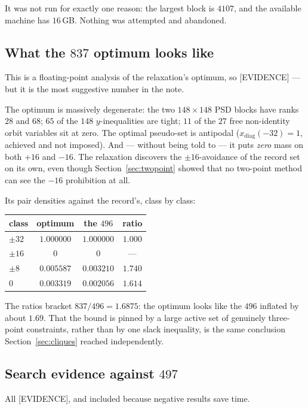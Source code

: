 \documentclass[10pt,a4paper]{article}
\newcommand{\EV}{\textsf{[EVIDENCE]}}
\begin{document}
It was not run for exactly one reason: the largest block is $4107$, and the available machine has
$16$\,GB. Nothing was attempted and abandoned.

\subsection{What the $837$ optimum looks like}\label{sec:slack}

This is a floating-point analysis of the relaxation's optimum, so \EV{} --- but it is the most
suggestive number in the note.

The optimum is massively degenerate: the two $148 \times 148$ PSD blocks have ranks $28$ and $68$;
$65$ of the $148$ $y$-inequalities are tight; $11$ of the $27$ free non-identity orbit variables sit
at zero. The optimal pseudo-set is antipodal ($x_{\mathrm{diag}}(-32) = 1$, achieved and not
imposed). And --- without being told to --- it puts \emph{zero} mass on both $+16$ and $-16$. The
relaxation discovers the $\pm 16$-avoidance of the record set on its own, even though
Section~\ref{sec:twopoint} showed that no two-point method can see the $-16$ prohibition at all.

Its pair densities against the record's, class by class:
\begin{center}
\small
\begin{tabular}{@{}lccc@{}}
\toprule
class & optimum & the $496$ & ratio \\
\midrule
$\pm 32$ & $1.000000$ & $1.000000$ & $1.000$ \\
$\pm 16$ & $0$ & $0$ & --- \\
$\pm 8$ & $0.005587$ & $0.003210$ & $1.740$ \\
$0$ & $0.003319$ & $0.002056$ & $1.614$ \\
\bottomrule
\end{tabular}
\end{center}
The ratios bracket $837/496 = 1.6875$: the optimum looks like the $496$ inflated by about $1.69$.
That the bound is pinned by a large active set of genuinely three-point constraints, rather than by
one slack inequality, is the same conclusion Section~\ref{sec:cliques} reached independently.

\subsection{Search evidence against $497$}\label{sec:search}

All \EV{}, and included because negative results save time.
\end{document}
